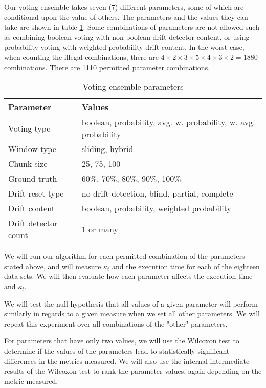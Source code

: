 \begin{table}[]
\begin{tabular}{|l|l|}
\end{tabular}
\end{table}

Our voting ensemble takes seven (7) different parameters, some of which are conditional upon the value of others. The parameters and the values they can take are shown in table \ref{table:ensemble_params}. Some combinations of parameters are not allowed such as combining boolean voting with non-boolean drift detector content, or using probability voting with weighted probability drift content. In the worst case, when counting the illegal combinations, there are $4\times2\times3\times5\times4\times3\times2=1880$ combinations. There are 1110 permitted parameter combinations.

\begin{table}[]
\caption{Voting ensemble parameters\label{table:ensemble_params}}
\begin{tabular}{|l|l|}
\hline
\textbf{Parameter} & \textbf{Values} \\ \hline \hhline{==}
Voting type & boolean, probability, avg. w. probability, w. avg. probability \\ \hline
Window type & sliding, hybrid \\ \hline
Chunk size & 25, 75, 100 \\ \hline
Ground truth & 60\%, 70\%, 80\%, 90\%, 100\% \\ \hline
Drift reset type & no drift detection, blind, partial, complete \\ \hline
Drift content & boolean, probability, weighted probability \\ \hline
Drift detector count & 1 or many \\ \hline
\end{tabular}
\end{table}

We will run our algorithm for each permitted combination of the parameters stated above, and will measure  $\kappa_t$ and the execution time for each of the eighteen data sets. We will then evaluate how each parameter affects the execution time and $\kappa_t$.

We will test the null hypothesis that all values of a given parameter will perform similarly in regards to a given measure when we set all other parameters. We will repeat this experiment over all combinations of the "other" parameters.

For parameters that have only two values, we will use the Wilcoxon test to determine if the values of the parameters lead to statistically significant differences in the metrics measured. We will also use the internal intermediate results of the Wilcoxon test to rank the parameter values, again depending on the metric measured.

